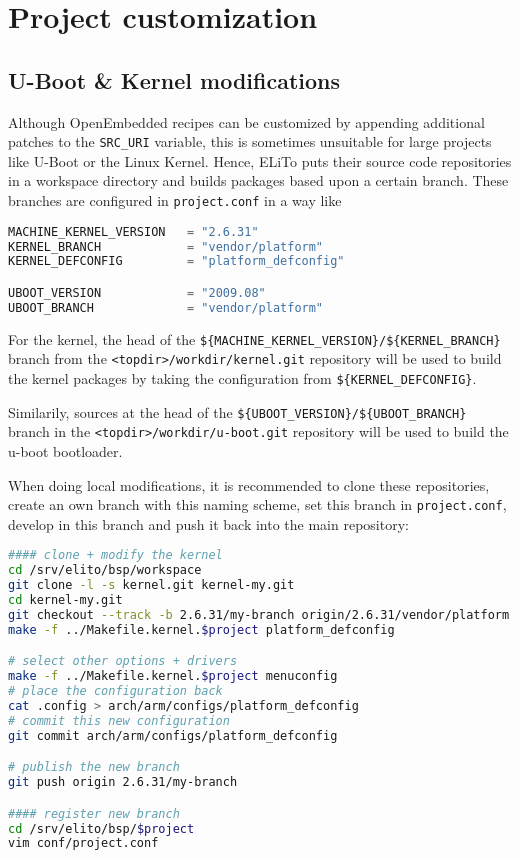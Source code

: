 \chapter{Project customization}
\label{chap:project-customization}

\section{U-Boot \& Kernel modifications}
\label{sec:project-customization_u-boot+kernel-modifications}

Although OpenEmbedded recipes can be customized by appending
additional patches to the \texttt{SRC\_URI} variable, this is
sometimes unsuitable for large projects like U-Boot or the Linux
Kernel.  Hence, ELiTo puts their source code repositories in a
workspace directory and builds packages based upon a certain
branch. These branches are configured in \texttt{project.conf} in a
way like

\begin{lstlisting}[language=python]
MACHINE_KERNEL_VERSION   = "2.6.31"
KERNEL_BRANCH            = "vendor/platform"
KERNEL_DEFCONFIG         = "platform_defconfig"

UBOOT_VERSION            = "2009.08"
UBOOT_BRANCH             = "vendor/platform"
\end{lstlisting}

For the kernel, the head of the
\texttt{\$\{MACHINE\_KERNEL\_VERSION\}/\$\{KERNEL\_BRANCH\}} branch
from the \texttt{<topdir>/workdir/kernel.git} repository will be used
to build the kernel packages by taking the configuration from
\texttt{\$\{KERNEL\_DEFCONFIG\}}.

Similarily, sources at the head of the
\texttt{\$\{UBOOT\_VERSION\}/\$\{UBOOT\_BRANCH\}} branch in the
\texttt{<topdir>/workdir/u-boot.git} repository will be used to
build the u-boot bootloader.

When doing local modifications, it is recommended to clone these
repositories, create an own branch with this naming scheme, set this
branch in \texttt{project.conf}, develop in this branch and push it
back into the main repository:


\label{sec:project-customization_u-boot+kernel-modifications_clone+modify}
\begin{lstlisting}[language=sh]
#### clone + modify the kernel
cd /srv/elito/bsp/workspace
git clone -l -s kernel.git kernel-my.git
cd kernel-my.git
git checkout --track -b 2.6.31/my-branch origin/2.6.31/vendor/platform
make -f ../Makefile.kernel.$project platform_defconfig

# select other options + drivers
make -f ../Makefile.kernel.$project menuconfig
# place the configuration back
cat .config > arch/arm/configs/platform_defconfig
# commit this new configuration
git commit arch/arm/configs/platform_defconfig

# publish the new branch
git push origin 2.6.31/my-branch

#### register new branch
cd /srv/elito/bsp/$project
vim conf/project.conf
\end{lstlisting}

